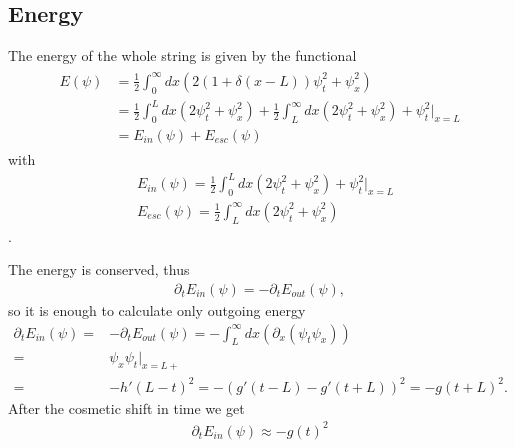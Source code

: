 \documentclass[
a4paper,%
10pt,%
titlepage,%
twoside%
]{article}
\begin{document}



\subsection{Energy}
The energy of the whole string is given by the functional
\begin{align}
  \begin{split}
    E(\psi)&=\frac{1}{2}\int_0^\infty dx (2(1+\delta(x-L))\psi_t^2+\psi_x^2)\\
    &=\frac{1}{2}\int_0^L dx(2\psi_t^2+\psi_x^2)+\frac{1}{2}\int_L^\infty dx(2\psi_t^2+\psi_x^2)+\psi_t^2\bigg|_{x=L}\\
    &=E_{in}(\psi)+E_{esc}(\psi)
  \end{split}
\end{align}
with
\begin{align}
  &E_{in}(\psi)=\frac{1}{2}\int_0^L dx(2\psi_t^2+\psi_x^2)+\psi_t^2\bigg|_{x=L}\\
  &E_{esc}(\psi)=\frac{1}{2}\int_L^\infty dx(2\psi_t^2+\psi_x^2)
\end{align}.

The energy is conserved, thus
\begin{align}
  \partial_t E_{in}(\psi)=-\partial_t E_{out}(\psi),
\end{align}
so it is enough to calculate only outgoing energy
\begin{align}
  \partial_t E_{in}(\psi)=&-\partial_t E_{out}(\psi)=-\int_L^\infty dx(\partial_x(\psi_t\psi_x))\\
  =&\psi_x\psi_t\big|_{x=L+}\\
  =&-h'(L-t)^2=-(g'(t-L)-g'(t+L))^2=-g(t+L)^2.
\end{align}
After the cosmetic shift in time we get
\begin{align}
  \partial_t E_{in}(\psi)\approx -g(t)^2
\end{align}
\end{document}
